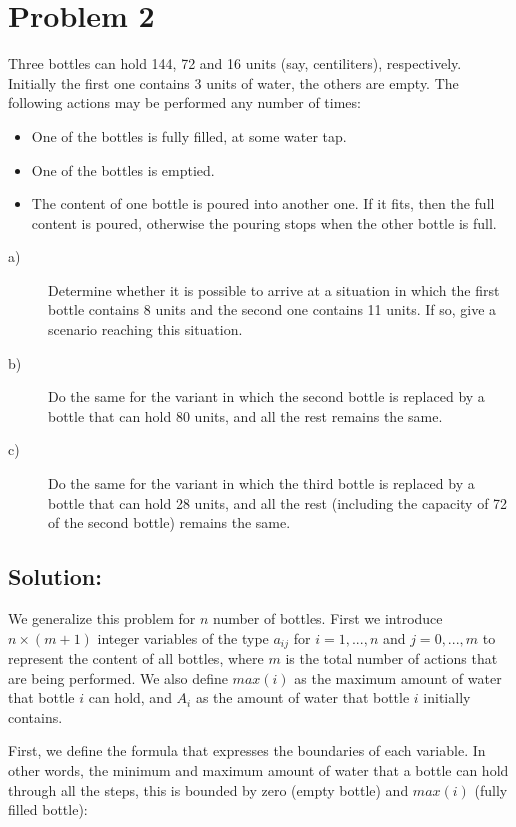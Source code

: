 \section*{Problem 2}
Three bottles can hold 144, 72 and 16 units (say, centiliters), respectively. Initially the first one contains 3 units of water, the others are empty. The following actions may be performed any number of times:

\begin{itemize}
  \item One of the bottles is fully filled, at some water tap.
  \item One of the bottles is emptied.
  \item The content of one bottle is poured into another one. If it fits, then the full content is poured, otherwise the pouring stops when the other bottle is full.
\end{itemize}

\begin{description}
  \item[a)] Determine whether it is possible to arrive at a situation in which the first bottle contains 8 units and the second one contains 11 units. If so, give a scenario reaching this situation.
  \item[b)] Do the same for the variant in which the second bottle is replaced by a bottle that can hold 80 units, and all the rest remains the same.
  \item[c)] Do the same for the variant in which the third bottle is replaced by a bottle that can hold 28 units, and all the rest (including the capacity of 72 of the second bottle) remains the same.
\end{description}


\subsection*{Solution:}

We generalize this problem for $n$ number of bottles. First we introduce $n \times (m + 1)$ integer variables of the type $a_{ij}$ for $i = 1,...,n$ and $j = 0,...,m$ to represent the content of all bottles, where $m$ is the total number of actions that are being performed. We also define $max(i)$ as the maximum amount of water that bottle $i$ can hold, and $A_i$ as the amount of water that bottle $i$ initially contains.

First, we define the formula that expresses the boundaries of each variable. In other words, the minimum and maximum amount of water that a bottle can hold through all the steps, this is bounded by zero (empty bottle) and $max(i)$ (fully filled bottle):

